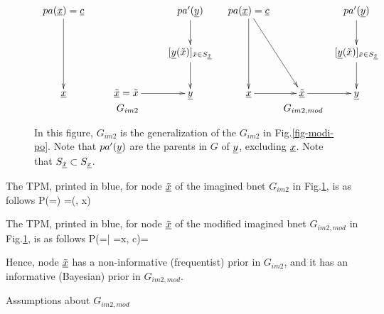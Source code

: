 \begin{figure}[h!]
$$
\begin{array}{cc}
\xymatrix{
pa(\rvx) =\rvc
\ar[dd]
&
&pa'(\rvy)\ar[d]
\\
&&[\rvy(\tilx)]_{\tilx\in S_{\ul{\tilx}}}\ar[d]
\\
\rvx
&\ul{\tilx}=\tilx\ar[r]
&\rvy
}
&
\xymatrix{
pa(\rvx)=\rvc
\ar[dd]\ar[ddr]
&
&pa'(\rvy)\ar[d]
\\
&&[\rvy(\tilx)]_{\tilx\in S_{\ul{\tilx}}}\ar[d]
\\
\rvx\ar[r]
&\ul{\tilx}\ar[r]
&\rvy
}
\\
G_{im2}
 &G_{im2,mod}
\end{array}
$$
\caption{In this figure, $G_{im2}$
is the generalization of the $G_{im2}$
in Fig.\ref{fig-modi-po}.
Note that $pa'({\underline{y}})$ are the parents in $G$ of
${\underline{y}}$, excluding ${\underline{x}}$.
Note that $S_{\underline{{\tilde{x}}}}\subset S_{\underline{x}}$. }
\label{fig-unmodi-modi}
\end{figure}

The TPM, printed in  blue, for node $\underline{{\tilde{x}}}$
of the imagined bnet $G_{im2}$ in Fig.\ref{fig-unmodi-modi}, is as follows
\beq\color{blue}
P(\ul{\tilx}=\tilx) =\delta(\tilx, x)
\eeq

The TPM, printed in  blue, for node $\underline{{\tilde{x}}}$
of the modified imagined bnet $G_{im2,mod}$ in Fig.\ref{fig-unmodi-modi},
 is as follows
\beq\color{blue}
P(\ul{\tilx}=\tilx | \rvx=x, c)= 
\eeq

Hence, node $\underline{{\tilde{x}}}$
has a non-informative (frequentist) prior in $G_{im2}$,
and it has an informative (Bayesian) prior in $G_{im2,mod}$.

Assumptions about $G_{im2, mod}$

